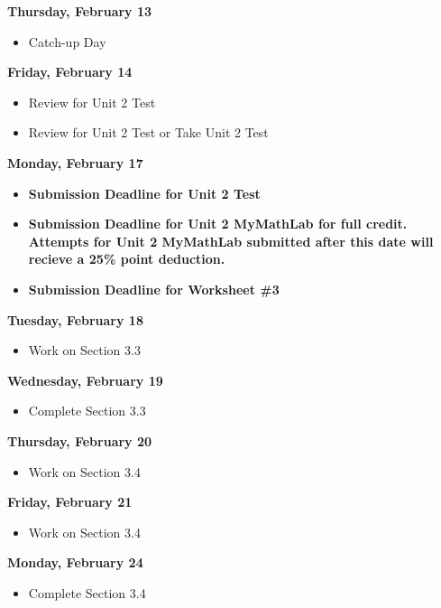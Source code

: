 \documentclass[11pt]{article}
\begin{document}
\textbf{Thursday, February 13}

\begin{itemize}
\item Catch-up Day
\end{itemize}

\textbf{Friday, February 14}

\begin{itemize}
\item Review for Unit 2 Test
\item Review for Unit 2 Test or Take Unit 2 Test
\end{itemize}

\textbf{Monday, February 17}

\begin{itemize}
\item \textbf{Submission Deadline for Unit 2 Test}
\item \textbf{Submission Deadline for Unit 2 MyMathLab for full credit. Attempts for Unit 2 MyMathLab submitted after this date will recieve a 25\% point deduction.}
\item \textbf{Submission Deadline for Worksheet \#3}
\end{itemize}

\textbf{Tuesday, February 18}

\begin{itemize}
\item Work on Section 3.3
\end{itemize}

\textbf{Wednesday, February 19}

\begin{itemize}
\item Complete Section 3.3
\end{itemize}

\textbf{Thursday, February 20}

\begin{itemize}
\item Work on Section 3.4
\end{itemize}

\textbf{Friday, February 21}

\begin{itemize}
\item Work on Section 3.4
\end{itemize}

\textbf{Monday, February 24}

\begin{itemize}
\item Complete Section 3.4
\end{itemize}
\end{document}
